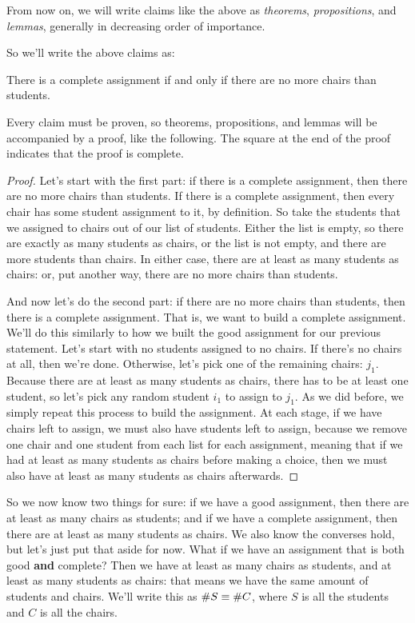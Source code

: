 From now on, we will write claims like the above as \emph{theorems}, \emph{propositions}, and \emph{lemmas}, generally in decreasing order of importance.

So we'll write the above claims as:
\begin{theorem}
    There is a complete assignment if and only if there are no more chairs than students.
\end{theorem}

Every claim must be proven, so theorems, propositions, and lemmas will be accompanied by a proof, like the following.
The square at the end of the proof indicates that the proof is complete.

\begin{proof}
    Let's start with the first part: if there is a complete assignment, then there are no more chairs than students.
    If there is a complete assignment, then every chair has some student assignment to it, by definition.
    So take the students that we assigned to chairs out of our list of students.
    Either the list is empty, so there are exactly as many students as chairs, or the list is not empty, and there are more students than chairs.
    In either case, there are at least as many students as chairs: or, put another way, there are no more chairs than students.

    And now let's do the second part: if there are no more chairs than students, then there is a complete assignment.
    That is, we want to build a complete assignment.
    We'll do this similarly to how we built the good assignment for our previous statement.
    Let's start with no students assigned to no chairs.
    If there's no chairs at all, then we're done.
    Otherwise, let's pick one of the remaining chairs: $j_1$.
    Because there are at least as many students as chairs, there has to be at least one student, so let's pick any random student $i_1$ to assign to $j_1$.
    As we did before, we simply repeat this process to build the assignment.
    At each stage, if we have chairs left to assign, we must also have students left to assign, because we remove one chair and one student from each list for each assignment, meaning that if we had at least as many students as chairs before making a choice, then we must also have at least as many students as chairs afterwards.
\end{proof}

So we now know two things for sure: if we have a good assignment, then there are at least as many chairs as students; and if we have a complete assignment, then there are at least as many students as chairs.
We also know the converses  hold, but let's just put that aside for now.
What if we have an assignment that is both good \textbf{and} complete?
Then we have at least as many chairs as students, and at least as many students as chairs: that means we have the same amount of students and chairs.
We'll write this as $\# S \equiv \# C$, where $S$ is all the students and $C$ is all the chairs.

